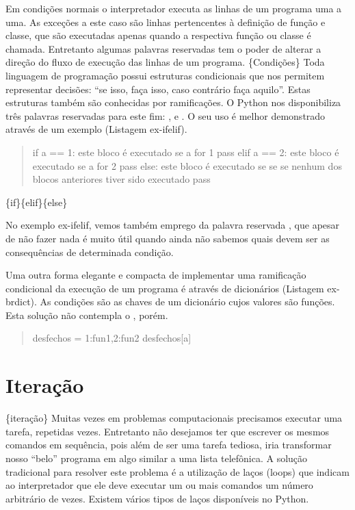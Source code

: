 \documentclass[a4paper,10pt,brazil]{sphinxmanual}
\begin{document}
Em condições normais o interpretador executa as linhas de um
programa uma a uma. As exceções a este caso são linhas pertencentes
à definição de função e classe, que são executadas apenas quando a
respectiva função ou classe é chamada. Entretanto algumas palavras
reservadas tem o poder de alterar a direção do fluxo de execução
das linhas de um programa. \{Condições\} Toda linguagem de
programação possui estruturas condicionais que nos permitem
representar decisões:
``se isso, faça isso, caso contrário faça aquilo''. Estas estruturas
também são conhecidas por ramificações. O Python nos disponibiliza
três palavras reservadas para este fim:  ,  e
. O seu uso é melhor demonstrado através de um exemplo
(Listagem ex-ifelif).
\begin{quote}

if a == 1: este bloco é executado se a for 1 pass elif a == 2: este
bloco é executado se a for 2 pass else: este bloco é executado se
se se nenhum dos blocos anteriores tiver sido executado pass
\end{quote}

\{if\}\{elif\}\{else\}

No exemplo ex-ifelif, vemos também emprego da palavra reservada
, que apesar de não fazer nada é muito útil quando ainda
não sabemos quais devem ser as consequências de determinada
condição.

Uma outra forma elegante e compacta de implementar uma ramificação
condicional da execução de um programa é através de dicionários
(Listagem ex-brdict). As condições são as chaves de um dicionário
cujos valores são funções. Esta solução não contempla o ,
porém.
\begin{quote}

desfechos = 1:fun1,2:fun2 desfechos{[}a{]}
\end{quote}


\section{Iteração}
\label{Cap2:iteracao}
\{iteração\} Muitas vezes em problemas computacionais precisamos
executar uma tarefa, repetidas vezes. Entretanto não desejamos ter
que escrever os mesmos comandos em sequência, pois além de ser uma
tarefa tediosa, iria transformar nosso ``belo'' programa em algo
similar a uma lista telefônica. A solução tradicional para resolver
este problema é a utilização de laços (loops) que indicam ao
interpretador que ele deve executar um ou mais comandos um número
arbitrário de vezes. Existem vários tipos de laços disponíveis no
Python.
\end{document}
